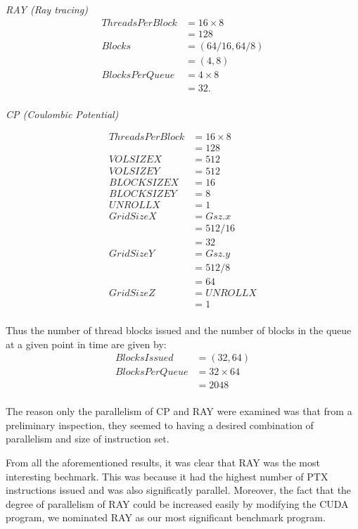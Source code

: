 \emph{RAY (Ray tracing)}
\begin{align*}
ThreadsPerBlock& = 16 \times 8\\
& = 128\\
Blocks& = (64/16, 64/8)\\
& = (4,8)\\
BlocksPerQueue& = 4 \times 8\\
& = 32.\\
\end{align*}

\emph{CP (Coulombic Potential)}

\begin{align*}
ThreadsPerBlock& = 16 \times 8\\
& = 128\\
VOLSIZEX& = 512\\
VOLSIZEY& = 512\\
BLOCKSIZEX& = 16\\
BLOCKSIZEY& = 8\\
UNROLLX&  = 1\\
GridSizeX& = Gsz.x\\& = 512/16\\& = 32\\
GridSizeY& = Gsz.y\\& = 512/8\\& = 64\\
GridSizeZ& = UNROLLX\\& = 1\\
\end{align*}

Thus the number of thread blocks issued and the number of blocks in
the queue at a given point in time are given by:
\begin{align*}
BlocksIssued& = (32, 64)\\
BlocksPerQueue& = 32 \times 64\\& = 2048\\
\end{align*}

The reason only the parallelism of CP and RAY were examined was that
from a preliminary inspection, they seemed to having a desired
combination of parallelism and size of instruction set. 

From all the aforementioned results, it was clear that RAY was the
most interesting bechmark. 
This was because it had the highest number of PTX instructions issued
and was also significatly parallel. 
Moreover, the fact that the degree of parallelism of RAY could be
increased easily by modifying the CUDA program, we nominated RAY as
our most significant benchmark program.
 


